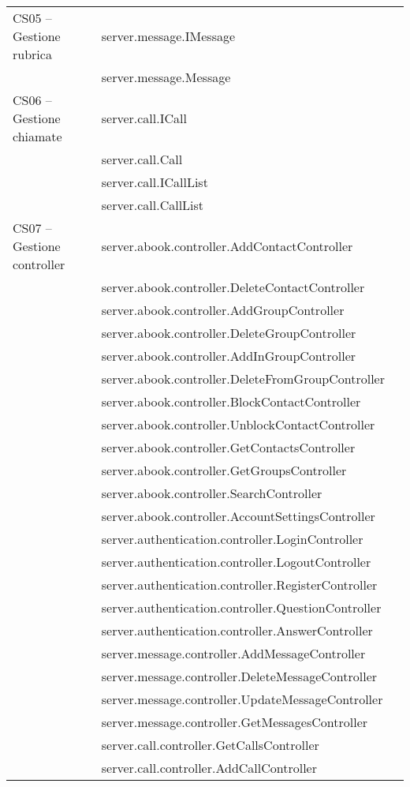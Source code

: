 \begin{center}
\begin{longtable}{lp{}l}
CS05 -- Gestione rubrica & server.message.IMessage\\
& server.message.Message\\

CS06 -- Gestione chiamate
 & server.call.ICall\\
& server.call.Call\\
 & server.call.ICallList\\
& server.call.CallList\\

CS07 -- Gestione controller & server.abook.controller.AddContactController\\
& server.abook.controller.DeleteContactController\\
& server.abook.controller.AddGroupController\\
& server.abook.controller.DeleteGroupController\\
& server.abook.controller.AddInGroupController\\
& server.abook.controller.DeleteFromGroupController\\
& server.abook.controller.BlockContactController\\
& server.abook.controller.UnblockContactController\\
& server.abook.controller.GetContactsController\\
& server.abook.controller.GetGroupsController\\
& server.abook.controller.SearchController\\
& server.abook.controller.AccountSettingsController\\
& server.authentication.controller.LoginController\\
& server.authentication.controller.LogoutController\\
& server.authentication.controller.RegisterController\\
& server.authentication.controller.QuestionController\\
& server.authentication.controller.AnswerController\\
& server.message.controller.AddMessageController\\
& server.message.controller.DeleteMessageController\\
& server.message.controller.UpdateMessageController\\
& server.message.controller.GetMessagesController\\
& server.call.controller.GetCallsController\\
& server.call.controller.AddCallController\\


\end{longtable}
\end{center}
